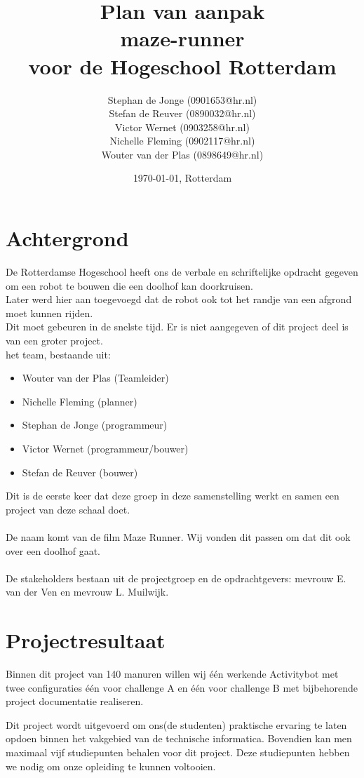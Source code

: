 \documentclass[oneside]{book}
\title{Plan van aanpak\\
maze-runner\\
\normalsize voor de Hogeschool Rotterdam
}
\author{
	Stephan de Jonge (0901653@hr.nl)\\
	Stefan de Reuver (0890032@hr.nl)\\
	Victor Wernet (0903258@hr.nl)\\
	Nichelle Fleming (0902117@hr.nl)\\
	Wouter van der Plas (0898649@hr.nl)
}
\date{\today, Rotterdam}
\begin{document}
\maketitle
\tableofcontents


\chapter{Achtergrond}

De Rotterdamse Hogeschool heeft ons de verbale en schriftelijke opdracht gegeven om een robot te bouwen die een doolhof kan doorkruisen.\\
Later werd hier aan toegevoegd dat de robot ook tot het randje van een afgrond moet kunnen rijden.\\
Dit moet gebeuren in de snelste tijd. Er is niet aangegeven of dit project deel is van een groter project.\\
het team, bestaande uit:\\
\begin{itemize}
	\item Wouter van der Plas (Teamleider)
	\item Nichelle Fleming (planner)
	\item Stephan de Jonge (programmeur)
	\item Victor Wernet (programmeur/bouwer)
	\item Stefan de Reuver (bouwer)
\end{itemize}	
Dit is de eerste keer dat deze groep in deze samenstelling werkt en samen een project van deze schaal doet.\\
\\
De naam komt van de film Maze Runner. Wij vonden dit passen om dat dit ook over een doolhof gaat.\\
\\
De stakeholders bestaan uit de projectgroep en de opdrachtgevers: mevrouw E. van der Ven en mevrouw L. Muilwijk.

\clearpage
\chapter{Projectresultaat}

Binnen dit project van 140 manuren willen wij één werkende Activitybot met twee configuraties één voor challenge A en één voor challenge B met bijbehorende project documentatie realiseren.

Dit project wordt uitgevoerd om ons(de studenten) praktische ervaring te laten opdoen binnen het vakgebied van de technische informatica.
Bovendien kan men maximaal vijf studiepunten behalen voor dit project.
Deze studiepunten hebben we nodig om onze opleiding te kunnen voltooien.
\end{document}
